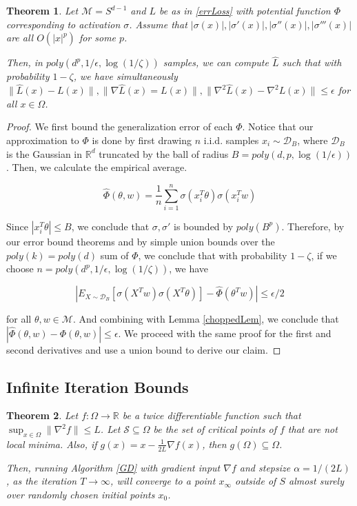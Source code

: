 \documentclass{article}
\newtheorem{theorem}{Theorem}[section]
\newcommand{\R}{{\mathbb{R}}}
\begin{document}
\begin{theorem}
\label{genErrBound}
Let $\mathcal{M} = S^{d-1}$ and $L$ be as in \ref{errLoss} with potential function $\Phi$ corresponding to activation $\sigma$. Assume that $|\sigma(x)|, |\sigma'(x)|,|\sigma''(x)|, |\sigma'''(x)|$ are all $O(|x|^p)$ for some $p$.  

Then, in $poly(d^p,1/\epsilon, \log(1/\zeta))$ samples, we can compute $\hat{L}$ such that with probability $1-\zeta$, we have simultaneously $\|\widehat{L}(x) -L(x)\|, \|\nabla \widehat{L}(x) = L(x)\|, \|\nabla^2\widehat{L}(x) -\nabla^2 L(x)\| \leq \epsilon$ for all $x\in \Omega$.
\end{theorem}

\begin{proof}
We first bound the generalization error of each $\Phi$. Notice that our approximation to $\Phi$ is done by first drawing $n$ i.i.d. samples $x_i \sim \mathcal{D}_B$, where $\mathcal{D}_B$ is the Gaussian in $\R^d$ truncated by the ball of radius $B = poly(d,p,\log(1/\epsilon))$. Then, we calculate the empirical average.

\[\widehat{\Phi}(\theta,w) = \frac{1}{n}\sum_{i=1}^n \sigma(x_i^T\theta)\sigma(x_i^Tw) \]

Since $|x_i^T\theta|\leq B$, we conclude that $\sigma, \sigma'$ is bounded by $poly(B^p)$. Therefore, by our error bound theorems and by simple union bounds over the $poly(k) = poly(d)$ sum of $\Phi$, we conclude that with probability $1-\zeta$, if we choose $n = poly(d^p,1/\epsilon, \log(1/\zeta))$, we have 

\[|E_{X\sim \mathcal{D}_B}[\sigma(X^Tw)\sigma(X^T\theta)] - \widehat{\Phi}(\theta^Tw)| \leq \epsilon/2\]

for all $\theta, w \in \mathcal{M}$. And combining with Lemma \ref{choppedLem}, we conclude that $|\widehat{\Phi}(\theta,w) - \Phi(\theta,w)|\leq \epsilon$. We proceed with the same proof for the first and second derivatives and use a union bound to derive our claim.
\end{proof}

\subsection{Infinite Iteration Bounds} 
\label{InfIter}


\begin{theorem}\cite{lee2016gradient}\cite{PanageasP16}\label{convStrict}
Let $f :\Omega \to \R$ be a twice differentiable function such that $\sup_{x \in \Omega} \|\nabla^2 f\| \leq L$. Let $\mathcal{S} \subseteq \Omega$ be the set of critical points of $f$ that are not local minima. Also, if $g(x) = x - \frac{1}{2L} \nabla f(x)$, then $g(\Omega) \subseteq \Omega$. 

Then, running Algorithm \ref{GD} with gradient input $\nabla f$ and stepsize $\alpha = 1/(2L)$, as the iteration  $T \to\infty$, will converge to a point $x_\infty$ outside of $S$ almost surely over randomly chosen initial points $x_0$. 
\end{theorem}
\end{document}

